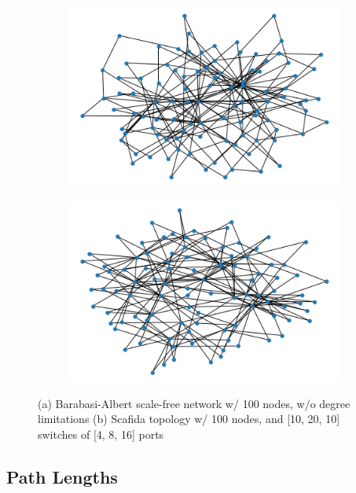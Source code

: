 \begin{figure}[h!]
\begin{subfigure}[b]{0.5\textwidth}
  \centering
   \includegraphics[width=0.9\linewidth]{figures/barabasi}
   \caption{}
   \label{fig:Ng1} 
\end{subfigure}

\begin{subfigure}[b]{0.5\textwidth}
  \centering
   \includegraphics[width=0.9\linewidth]{figures/scafida}
   \caption{}
   \label{fig:Ng2}
\end{subfigure}

\caption{(a) Barabasi-Albert scale-free network w/ 100 nodes, w/o degree limitations
(b) Scafida topology w/ 100 nodes, and [10, 20, 10] switches of [4, 8, 16] ports}
\end{figure}

\subsection{Path Lengths}

